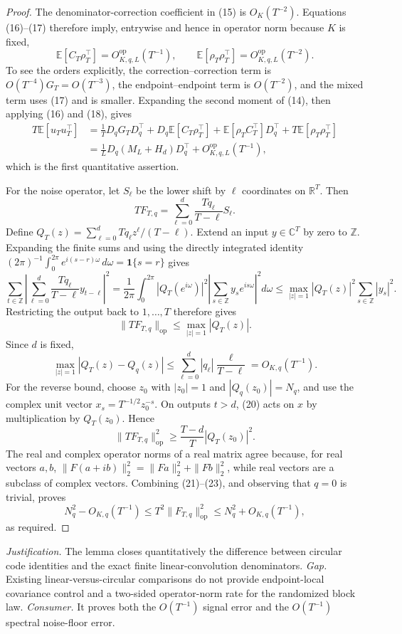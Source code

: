 \documentclass{article}
\begin{document}
\begin{proof}
The denominator-correction coefficient in (15) is \(O_K(T^{-2})\).  Equations (16)--(17) therefore imply, entrywise and hence in operator norm because \(K\) is fixed,
\[
\mathbb E[C_T\rho_T^{\top}]=O_{K,q,L}^{\mathrm{op}}(T^{-1}),
\qquad
\mathbb E[\rho_T\rho_T^{\top}]=O_{K,q,L}^{\mathrm{op}}(T^{-2}). \tag{18}
\]
To see the orders explicitly, the correction--correction term is \(O(T^{-4})G_T=O(T^{-3})\), the endpoint--endpoint term is \(O(T^{-2})\), and the mixed term uses (17) and is smaller.  Expanding the second moment of (14), then applying (16) and (18), gives
\[
\begin{aligned}
T\mathbb E[u_Tu_T^{\top}]
&=\frac1T D_qG_TD_q^{\top}
+D_q\mathbb E[C_T\rho_T^{\top}]
+\mathbb E[\rho_TC_T^{\top}]D_q^{\top}
+T\mathbb E[\rho_T\rho_T^{\top}]\\
&=\frac1L D_q(M_L+H_d)D_q^{\top}
+O_{K,q,L}^{\mathrm{op}}(T^{-1}), \tag{19}
\end{aligned}
\]
which is the first quantitative assertion.

For the noise operator, let \(S_\ell\) be the lower shift by \(\ell\) coordinates on \(\mathbb R^T\).  Then
\[
TF_{T,q}=\sum_{\ell=0}^d\frac{Tq_\ell}{T-\ell}S_\ell. \tag{20}
\]
Define \(Q_T(z)=\sum_{\ell=0}^dTq_\ell z^\ell/(T-\ell)\).  Extend an input \(y\in\mathbb C^T\) by zero to \(\mathbb Z\).  Expanding the finite sums and using the directly integrated identity \((2\pi)^{-1}\int_0^{2\pi}e^{i(s-r)\omega}\,d\omega=\mathbf1\{s=r\}\) gives
\[
\sum_{t\in\mathbb Z}\left|\sum_{\ell=0}^d\frac{Tq_\ell}{T-\ell}y_{t-\ell}\right|^2
=\frac1{2\pi}\int_0^{2\pi}|Q_T(e^{i\omega})|^2
 \left|\sum_{s\in\mathbb Z}y_se^{is\omega}\right|^2d\omega
\le \max_{|z|=1}|Q_T(z)|^2\sum_{s\in\mathbb Z}|y_s|^2.
\]
Restricting the output back to \(1,\ldots,T\) therefore gives
\[
\|TF_{T,q}\|_{\mathrm{op}}\le\max_{|z|=1}|Q_T(z)|. \tag{21}
\]
Since \(d\) is fixed,
\[
\max_{|z|=1}|Q_T(z)-Q_q(z)|
\le\sum_{\ell=0}^d|q_\ell|\frac{\ell}{T-\ell}=O_{K,q}(T^{-1}). \tag{22}
\]
For the reverse bound, choose \(z_0\) with \(|z_0|=1\) and \(|Q_q(z_0)|=N_q\), and use the complex unit vector \(x_s=T^{-1/2}z_0^{-s}\).  On outputs \(t>d\), (20) acts on \(x\) by multiplication by \(Q_T(z_0)\).  Hence
\[
\|TF_{T,q}\|_{\mathrm{op}}^2
\ge\frac{T-d}{T}|Q_T(z_0)|^2. \tag{23}
\]
The real and complex operator norms of a real matrix agree because, for real vectors \(a,b\), \(\|F(a+ib)\|_2^2=\|Fa\|_2^2+\|Fb\|_2^2\), while real vectors are a subclass of complex vectors.  Combining (21)--(23), and observing that \(q=0\) is trivial, proves
\[
N_q^2-O_{K,q}(T^{-1})
\le T^2\|F_{T,q}\|_{\mathrm{op}}^2
\le N_q^2+O_{K,q}(T^{-1}), \tag{24}
\]
as required.
\end{proof}
\par\smallskip\noindent \textit{Justification.} The lemma closes quantitatively the difference between circular code identities and the exact finite linear-convolution denominators. \textit{Gap.} Existing linear-versus-circular comparisons do not provide endpoint-local covariance control and a two-sided operator-norm rate for the randomized block law. \textit{Consumer.} It proves both the \(O(T^{-1})\) signal error and the \(O(T^{-1})\) spectral noise-floor error.
\end{document}
